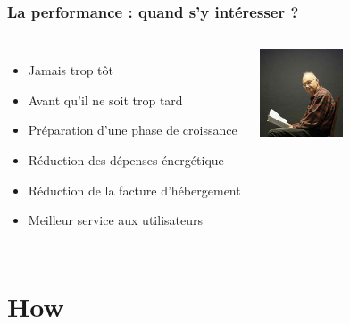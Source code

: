 \documentclass{beamer}
\begin{document}
\begin{frame}
  \frametitle{La performance : quand s'y intéresser ?}

  \vfill

\begin{columns}[c]

\begin{itemize}
  \item Jamais trop tôt
  \item Avant qu'il ne soit trop tard
  \item Préparation d'une phase de croissance
  \item Réduction des dépenses énergétique
  \item Réduction de la facture d'hébergement
  \item Meilleur service aux utilisateurs
\end{itemize}

\begin{center}
  \includegraphics[height=7em]{knuth.jpg}
\end{center}
\end{columns}
\end{frame}

\section{How}
\end{document}
